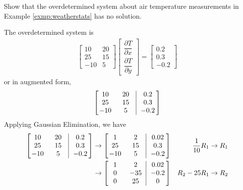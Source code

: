 \begin{exmp}
\label{exmp:weatherstats2}
Show that the overdetermined system about air temperature measurements in Example \ref{exmp:weatherstats} has no solution.
\end{exmp}
\begin{solution}
The overdetermined system is
\begin{align*}
\begin{bmatrix}
10 & 20 \\
25 & 15 \\
-10 & 5
\end{bmatrix}
\begin{bmatrix}
\dfrac{\partial T}{\partial x} \\[10pt]
\dfrac{\partial T}{\partial y} 
\end{bmatrix}
=
\begin{bmatrix}
0.2 \\
0.3 \\
-0.2
\end{bmatrix}
\end{align*}
or in augmented form,
\begin{align*}
\left[\begin{array}{@{}wc{20pt}wc{20pt}|wc{24pt}@{}}    
10 & 20 & 0.2 \\
25 & 15 & 0.3 \\
-10 & 5 & -0.2
\end{array}\right]
\end{align*}
Applying Gaussian Elimination, we have
\begin{align*}
\left[\begin{array}{@{}wc{20pt}wc{20pt}|wc{24pt}@{}}  
10 & 20 & 0.2 \\
25 & 15 & 0.3 \\
-10 & 5 & -0.2
\end{array}\right]
&\to 
\left[\begin{array}{@{}wc{20pt}wc{20pt}|wc{24pt}@{}}   
1 & 2 & 0.02 \\
25 & 15 & 0.3 \\
-10 & 5 & -0.2
\end{array}\right]
& \frac{1}{10} R_1 \to R_1 \\
&\to 
\left[\begin{array}{@{}wc{20pt}wc{20pt}|wc{24pt}@{}}    
1 & 2 & 0.02 \\
0 & -35 & -0.2 \\
0 & 25 & 0
\end{array}\right]
& \begin{aligned}
R_2 - 25R_1 \to R_2 \\

\end{aligned}
\end{align*}
\end{solution}
